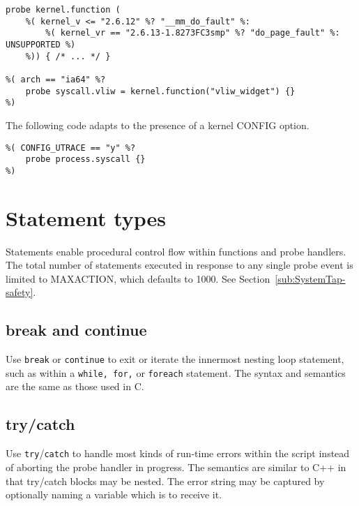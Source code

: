 \documentclass[twoside,english]{article}
\newenvironment{vindent}
{\begin{list}{}{\setlength{\listparindent}{6pt}}
\item[]}
{\end{list}}
\begin{document}
\begin{vindent}
\begin{verbatim}
probe kernel.function (
    %( kernel_v <= "2.6.12" %? "__mm_do_fault" %:
        %( kernel_vr == "2.6.13-1.8273FC3smp" %? "do_page_fault" %: UNSUPPORTED %)
    %)) { /* ... */ }

%( arch == "ia64" %?
    probe syscall.vliw = kernel.function("vliw_widget") {}
%)

\end{verbatim}
\end{vindent}

The following code adapts to the presence of a kernel CONFIG option.

\begin{vindent}
\begin{verbatim}
%( CONFIG_UTRACE == "y" %?
    probe process.syscall {}
%)
\end{verbatim}
\end{vindent}

\section{Statement types\label{sec:Statement-Types}}

Statements enable procedural control flow within functions and probe handlers.
The total number of statements executed in response to any single probe event
is limited to MAXACTION, which defaults to 1000. See Section~\ref{sub:SystemTap-safety}.


\subsection{break and continue}
Use \texttt{break} or \texttt{continue} to exit or iterate the innermost
nesting loop statement, such as within a \texttt{while, for,} or \texttt{foreach}
statement. The syntax and semantics are the same as those used in C.


\subsection{try/catch}
Use \texttt{try}/\texttt{catch} to handle most kinds of run-time errors within the script
instead of aborting the probe handler in progress.  The semantics are similar
to C++ in that try/catch blocks may be nested.  The error string may be captured
by optionally naming a variable which is to receive it.
\end{document}
